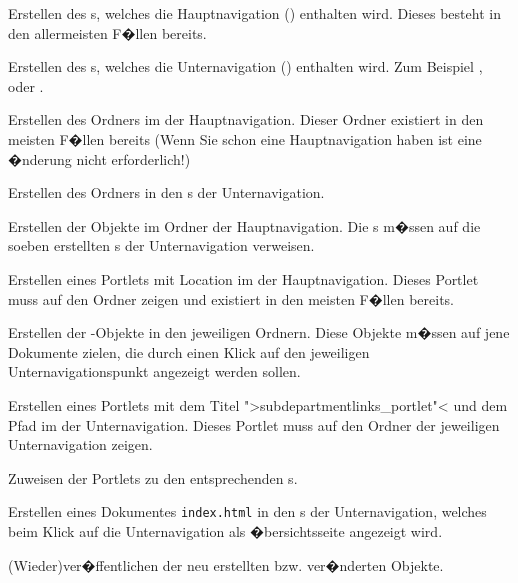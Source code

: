 \begin{compactitem}
\item{Erstellen des s, welches die
    Hauptnavigation () enthalten wird.
    Dieses  besteht in den allermeisten
    F�llen bereits.}
\item{Erstellen des s, welches die
    Unternavigation () enthalten wird.
    Zum Beispiel ,  oder
    .}
\item{Erstellen des Ordners  im
     der Hauptnavigation. Dieser Ordner
    existiert in den meisten F�llen bereits (Wenn Sie schon eine
    Hauptnavigation haben ist eine �nderung nicht erforderlich!)}
\item{Erstellen des Ordners  in den
    s der Unternavigation.}
\item{Erstellen der  Objekte im
     Ordner der Hauptnavigation. Die
    s m�ssen auf die soeben erstellten
    s der Unternavigation verweisen.}
\item{Erstellen eines Portlets mit Location
     im  der
    Hauptnavigation. Dieses Portlet muss auf den Ordner
     zeigen und existiert in den meisten F�llen
    bereits.}
\item{Erstellen der -Objekte in den jeweiligen
     Ordnern. Diese 
    Objekte m�ssen auf jene Dokumente zielen, die durch einen Klick
    auf den jeweiligen Unternavigationspunkt angezeigt werden sollen.}
\item{Erstellen eines Portlets mit dem Titel ">subdepartmentlinks\_portlet"< und dem Pfad
     im  der
    Unternavigation. Dieses Portlet muss auf den Ordner
     der jeweiligen Unternavigation zeigen.}
\item{Zuweisen der Portlets zu den entsprechenden
    s.}
\item{Erstellen eines Dokumentes \nolinkurl{index.html} in den
    s der Unternavigation, welches beim Klick
    auf die Unternavigation als �bersichtsseite angezeigt wird.}
\item{(Wieder)ver�ffentlichen der neu erstellten bzw. ver�nderten Objekte.}
\end{compactitem}

